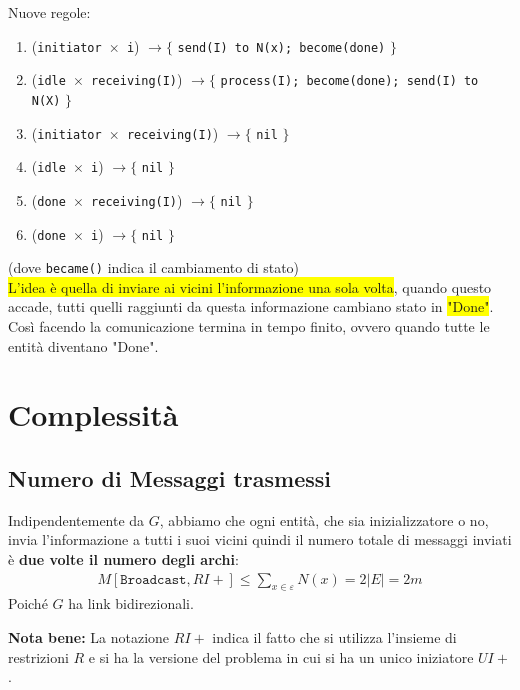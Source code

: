 Nuove regole:
\begin{enumerate}
    \item (\texttt{initiator $\times$ i}) $\rightarrow \lbrace$ \texttt{send(I) to N(x);
              become(done)} $\rbrace$
    \item (\texttt{idle $\times$ receiving(I)}) $\rightarrow \lbrace$ \texttt{process(I);
              become(done); send(I) to N(X)} $\rbrace$
    \item (\texttt{initiator $\times$ receiving(I)}) $\rightarrow \lbrace$ \texttt{nil}
          $\rbrace$
    \item (\texttt{idle $\times$ i}) $\rightarrow \lbrace$ \texttt{nil} $\rbrace$
    \item (\texttt{done $\times$ receiving(I)}) $\rightarrow \lbrace$ \texttt{nil}
          $\rbrace$
    \item (\texttt{done $\times$ i}) $\rightarrow \lbrace$ \texttt{nil} $\rbrace$
\end{enumerate}

(dove \verb|became()| indica il cambiamento di stato)\\

\colorbox{yellow}{L'idea è quella di inviare ai vicini l'informazione una sola
    volta}, quando questo accade, tutti quelli raggiunti da questa informazione
cambiano stato in \colorbox{yellow}{"Done"}. Così facendo la comunicazione
termina in tempo finito, ovvero quando tutte le entità diventano "Done".

\section{Complessità}
\subsection{Numero di Messaggi trasmessi}
Indipendentemente da $G$, abbiamo che ogni entità, che sia inizializzatore o no,
invia l'informazione a tutti i suoi vicini quindi il numero totale di messaggi
inviati è \textbf{due volte il numero degli archi}:
\begin{eqnarray}
    M[\texttt{Broadcast}, RI+]  \leq \sum_{x \in \varepsilon} N(x) = 2|E| = 2m
    \nonumber
\end{eqnarray}
Poiché $G$ ha link bidirezionali.

\textbf{Nota bene:} La notazione $RI+$ indica il fatto che si utilizza l'insieme
di restrizioni $R$ e si ha la versione del problema in cui si ha un unico
iniziatore $UI+$.

